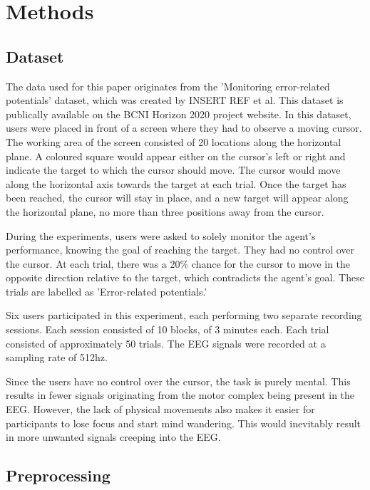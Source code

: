 \section{Methods}\label{sec:methods}

\subsection{Dataset}

The data used for this paper originates from the 'Monitoring error-related potentials' dataset, which was created by {INSERT REF} et al. This dataset is publically available on the BCNI Horizon 2020 project website. In this dataset, users were placed in front of a screen where they had to observe a moving cursor. The working area of the screen consisted of 20 locations along the horizontal plane. A coloured square would appear either on the cursor's left or right and indicate the target to which the cursor should move. The cursor would move along the horizontal axis towards the target at each trial. Once the target has been reached, the cursor will stay in place, and a new target will appear along the horizontal plane, no more than three positions away from the cursor.

During the experiments, users were asked to solely monitor the agent's performance, knowing the goal of reaching the target. They had no control over the cursor. At each trial, there was a 20\% chance for the cursor to move in the opposite direction relative to the target, which contradicts the agent's goal. These trials are labelled as 'Error-related potentials.'

Six users participated in this experiment, each performing two separate recording sessions. Each session consisted of 10 blocks, of 3 minutes each. Each trial consisted of approximately 50 trials. The EEG signals were recorded at a sampling rate of 512hz.

Since the users have no control over the cursor, the task is purely mental. This results in fewer signals originating from the motor complex being present in the EEG. However, the lack of physical movements also makes it easier for participants to lose focus and start mind wandering. This would inevitably result in more unwanted signals creeping into the EEG.


\subsection{Preprocessing}

